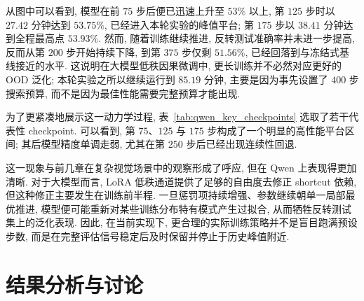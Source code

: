 \documentclass[a4paper,punct=banjiao,twoside]{ctexrep}
\theoremstyle{plain}
\theoremstyle{definition}
\theoremstyle{remark}
\begin{document}
从图中可以看到, 模型在前 $75$ 步后便已迅速上升至 $53\%$ 以上, 第 $125$ 步时以 $27.42$ 分钟达到 $53.75\%$, 已经进入本轮实验的峰值平台; 第 $175$ 步以 $38.41$ 分钟达到全程最高点 $53.93\%$. 然而, 随着训练继续推进, 反转测试准确率并未进一步提高, 反而从第 $200$ 步开始持续下降, 到第 $375$ 步仅剩 $51.56\%$, 已经回落到与冻结式基线接近的水平. 这说明在大模型低秩因果微调中, 更长训练并不必然对应更好的 OOD 泛化; 本轮实验之所以继续运行到 $85.19$ 分钟, 主要是因为事先设置了 $400$ 步搜索预算, 而不是因为最佳性能需要完整预算才能出现.

为了更紧凑地展示这一动力学过程, 表~\ref{tab:qwen_key_checkpoints} 选取了若干代表性 checkpoint. 可以看到, 第 $75$、$125$ 与 $175$ 步构成了一个明显的高性能平台区间; 其后模型精度单调走弱, 尤其在第 $250$ 步后已经出现连续性回退.

\begin{table}[htbp]
    \centering
    \caption{LoRA-BIRM Snapshot 在 Qwen 平台上的关键 checkpoint 表现.}
    \label{tab:qwen_key_checkpoints}
\end{table}

这一现象与前几章在复杂视觉场景中的观察形成了呼应, 但在 Qwen 上表现得更加清晰. 对于大模型而言, LoRA 低秩通道提供了足够的自由度去修正 shortcut 依赖, 但这种修正主要发生在训练前半程. 一旦惩罚项持续增强、参数继续朝单一局部最优推进, 模型便可能重新对某些训练分布特有模式产生过拟合, 从而牺牲反转测试集上的泛化表现. 因此, 在当前实现下, 更合理的实际训练策略并不是盲目跑满预设步数, 而是在完整评估信号稳定后及时保留并停止于历史峰值附近.

\section{结果分析与讨论}
\end{document}
